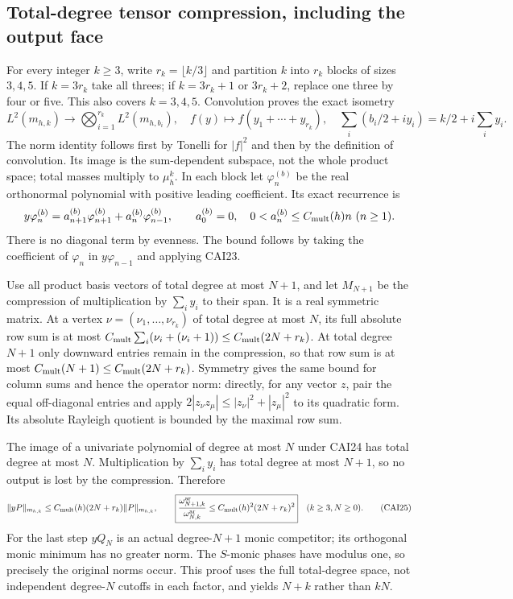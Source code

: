 \subsection{Total-degree tensor compression, including the output face}

For every integer $k\ge3$, write $r_k=\lfloor k/3\rfloor$ and
partition $k$ into $r_k$ blocks of sizes $3,4,5$. If $k=3r_k$ take
all threes; if $k=3r_k+1$ or $3r_k+2$, replace one three by four or
five. This also covers $k=3,4,5$. Convolution proves the exact isometry
\[
 L^2(m_{h,k})\longrightarrow\bigotimes_{i=1}^{r_k}L^2(m_{h,b_i}),
 \quad f(y)\longmapsto f(y_1+\cdots+y_{r_k}),\quad
 \sum_i(b_i/2+iy_i)=k/2+i\sum_iy_i.\tag{CAI24}
\]
The norm identity follows first by Tonelli for $|f|^2$ and then by
the definition of convolution. Its image is the sum-dependent
subspace, not the whole product space; total masses multiply to
$\mu_h^k$. In each block let $\varphi_n^{(b)}$ be the real orthonormal
polynomial with positive leading coefficient. Its exact recurrence is
\[
 y\varphi_n^{(b)}=a_{n+1}^{(b)}\varphi_{n+1}^{(b)}
                         +a_n^{(b)}\varphi_{n-1}^{(b)},\qquad
 a_0^{(b)}=0,\quad 0<a_n^{(b)}\le C_{\rm mult}(h)n\ (n\ge1).
\]
There is no diagonal term by evenness. The bound follows by taking
the coefficient of $\varphi_n$ in $y\varphi_{n-1}$ and applying CAI23.

Use all product basis vectors of total degree at most $N+1$, and let
$M_{N+1}$ be the compression of multiplication by $\sum_i y_i$ to
their span. It is a real symmetric matrix. At a vertex
$\nu=(\nu_1,\ldots,\nu_{r_k})$ of total degree at most $N$, its full
absolute row sum is at most
$C_{\rm mult}\sum_i(\nu_i+(\nu_i+1))\le C_{\rm mult}(2N+r_k)$.
At total degree $N+1$ only downward entries remain in the compression,
so that row sum is at most $C_{\rm mult}(N+1)\le C_{\rm mult}(2N+r_k)$.
Symmetry gives the same bound for column sums and hence the operator
norm: directly, for any vector $z$, pair the equal off-diagonal entries
and apply $2|z_\nu z_\mu|\le|z_\nu|^2+|z_\mu|^2$ to its quadratic
form. Its absolute Rayleigh quotient is bounded by the maximal row sum.

The image of a univariate polynomial of degree at most $N$ under CAI24
has total degree at most $N$. Multiplication by $\sum_i y_i$ has total
degree at most $N+1$, so no output is lost by the compression. Therefore
\[
 \|yP\|_{m_{h,k}}\le C_{\rm mult}(h)(2N+r_k)\|P\|_{m_{h,k}},\qquad
 \boxed{\frac{\omega_{N+1,k}^{\rm ar}}{\omega_{N,k}^{\rm ar}}
         \le C_{\rm mult}(h)^2(2N+r_k)^2}\quad(k\ge3,N\ge0).
 \tag{CAI25}
\]
For the last step $yQ_N$ is an actual degree-$N+1$ monic competitor;
its orthogonal monic minimum has no greater norm. The $S$-monic phases
have modulus one, so precisely the original norms occur. This proof
uses the full total-degree space, not independent degree-$N$ cutoffs
in each factor, and yields $N+k$ rather than $kN$.

